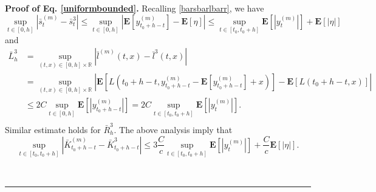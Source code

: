 \documentclass[10pt]{article}%
\numberwithin{equation}{section}
\newenvironment{proof}[1][Proof]{\noindent \textbf{#1.} }{\  \rule{0.5em}{0.5em}}
\def \E{\mathbf{E}}
\begin{document}
\begin{proof}[Proof of Eq. \eqref{uniformbounded}]
Recalling \eqref{barsbarlbarr}, we have %
$$\sup_{t\in [0,h]}\left|\bar{s}^{(m)}_{t}-\bar{s}^{3}_{t}\right|\leq\sup_{t\in [0,h]}\left|\mathbf{E}[y^{(m)}_{t_0+h-t}]-\mathbf{E}[\eta]\right|\leq\sup_{t\in [t_0,t_0+h]}\mathbf{E}[|y^{(m)}_{t}|]+\mathbf{E}\left[\left|\eta\right|\right]$$
and
$$
\begin{aligned}
\bar{L}_h^3&=\sup_{(t,x)\in[0,h]\times\mathbb{R}}\left|\bar{l}^{(m)}(t,x)-\bar{l}^{3}(t,x)\right|\\
  &=\sup_{(t,x)\in[0,h]\times\mathbb{R}} \left|\mathbf{E}\left[L(t_0+h-t,y^{(m)}_{t_0+h-t}-\E[y^{(m)}_{t_0+h-t}]+x)\right]-\mathbf{E}\left[L(t_0+h-t,x)\right]\right|\\
 &\leq 2C\sup_{t\in [0,h]}\E[|y_{t_0+h-t}^{(m)}|]=2C\sup_{t\in [t_0,t_0+h]}\mathbf{E}[|y^{(m)}_{t}|].\\
\end{aligned}
$$
Similar estimate holds for $\bar{R}^{3}_h$. The above analysis imply that 
\begin{equation}\label{t_0+h-t}
\sup_{t\in[t_0,t_0+h]}\left|\bar{K}^{(m)}_{t_0+h-t}-\bar{K}^{3}_{t_0+h-t}\right|\leq 3\frac{C}{c}\sup_{t\in [t_0,t_0+h]}\mathbf{E}[|y^{(m)}_{t}|]+\frac{C}{c}\mathbf{E}\left[\left|\eta\right|\right].    
\end{equation}


\end{proof}
\end{document}
